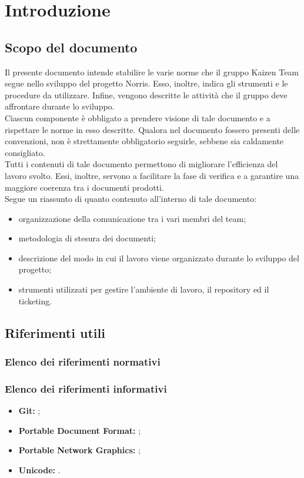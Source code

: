 \section{Introduzione}
	\subsection{Scopo del documento}
		Il presente documento intende stabilire le varie norme che il gruppo Kaizen Team segue nello sviluppo del progetto Norris. Esso, inoltre, indica gli strumenti e le procedure da utilizzare. Infine, vengono descritte le attività che il gruppo deve affrontare durante lo sviluppo.\\
		Ciascun componente è obbligato a prendere visione di tale documento e a rispettare le norme in esso descritte. Qualora nel documento fossero presenti delle convenzioni, non è strettamente obbligatorio seguirle, sebbene sia caldamente consigliato.\\
		Tutti i contenuti di tale documento permettono di migliorare l’efficienza del lavoro svolto. Essi, inoltre, servono a facilitare la fase di verifica e a garantire una maggiore coerenza tra i documenti prodotti.\\
		Segue un riassunto di quanto contenuto all'interno di tale documento:
		\begin{itemize}
			\item organizzazione della comunicazione tra i vari membri del team;
			\item metodologia di stesura dei documenti;
			\item descrizione del modo in cui il lavoro viene organizzato durante lo sviluppo del progetto;
			\item strumenti utilizzati per gestire l'ambiente di lavoro, il repository ed il ticketing.
		\end{itemize}

	
	

	\subsection{Riferimenti utili}
		\subsubsection{Elenco dei riferimenti normativi}
		\subsubsection{Elenco dei riferimenti informativi}
			\begin{itemize}
				\item \textbf{Git:} ;
				\item \textbf{Portable Document Format:} ;
				\item \textbf{Portable Network Graphics:} ;
				\item \textbf{Unicode:} .
			\end{itemize}